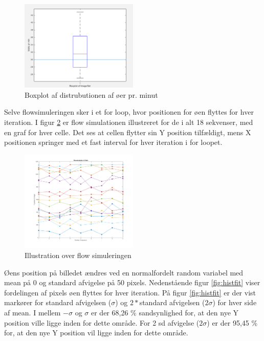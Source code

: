  \begin{figure}[H]
	\centering
	\includegraphics[width=0.5\textwidth]{billeder/software/boxplot.png}
	\caption{Boxplot af distrubutionen af øer pr. minut}
	\label{fig:boxplot}
\end{figure}

Selve flowsimuleringen sker i et for loop, hvor positionen for øen flyttes for hver iteration. I figur \ref{fig:flowsim} er flow simulationen illustreret for de i alt 18 sekvenser, med en graf for hver celle. Det ses at cellen flytter sin Y position tilfældigt, mens X positionen springer med et fast interval for hver iteration i for loopet.

\begin{figure}[H]
	\centering
	\includegraphics[width=0.5\textwidth]{billeder/software/Simulation.png}
	\caption{Illustration over flow simuleringen}
	\label{fig:flowsim}
\end{figure}


Øens position på billedet ændres ved en normalfordelt random variabel med mean på 0 og standard afvigelse på 50 pixels. Nedenstående figur \ref{fig:histfit} viser fordelingen af pixels øen flyttes for hver iteration. På figur \ref{fig:histfit} er der vist markører for standard afvigelsen ($\sigma$) og $2*$standard afvigelsen ($2\sigma$) for hver side af mean. I mellem $-\sigma$ og $\sigma$ er der 68,26 \% sandsynlighed for, at den nye Y position ville ligge inden for dette område. For 2 sd afvigelse ($2\sigma$) er der 95,45 \% for, at den nye Y position vil ligge inden for dette område.

